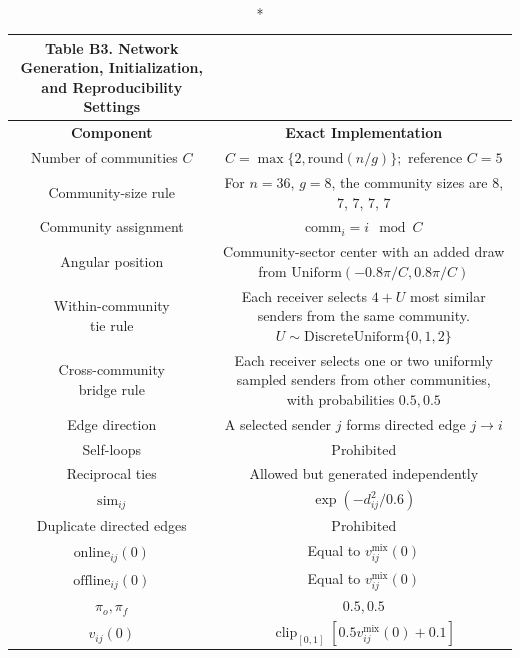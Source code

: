 \documentclass[11pt]{article}
\newcommand{\clip}{\operatorname{clip}_{[0,1]}}
\begin{document}
\begin{longtable}{|c|c|}
    \caption*{Table B3. Network Generation, Initialization, and Reproducibility Settings}
    \\
    \hline
    \textbf{Component} & \textbf{Exact Implementation} \\ \hline
    \endhead
         \hline
         Number of communities $C$&  $C=\max\{2,\text{round}(n/g)\};$ reference $C=5$\\
         \hline
         Community-size rule&  \makecell{For $n=36$, $g=8$,\\the community sizes are $8$, $7$, $7$, $7$, $7$}\\
         \hline
         Community assignment&  $\text{comm}_i=i\mod{C}$\\
         \hline
         Angular position&  \makecell{Community-sector center with an added draw\\from $\text{Uniform}(-0.8\pi/C,0.8\pi/C)$}\\
         \hline
         \makecell{Within-community\\tie rule}&  \makecell{Each receiver selects $4+U$ most similar senders\\from the same community. $U \sim \text{DiscreteUniform}\{0,1,2\}$}\\
         \hline
         \makecell{Cross-community\\bridge rule}&  \makecell{Each receiver selects one or two uniformly sampled senders\\from other communities, with probabilities $0.5,0.5$}\\
         \hline
         Edge direction&  A selected sender $j$ forms directed edge $j \rightarrow i$\\
         \hline
         Self-loops&  Prohibited\\
         \hline
         Reciprocal ties&  Allowed but generated independently\\
         \hline
         $\text{sim}_{ij}$& $\exp(-d_{ij}^2/0.6)$\\
         \hline
         Duplicate directed edges&  Prohibited\\
         \hline
         $\text{online}_{ij}(0)$&  Equal to $v_{ij}^{\text{mix}}(0)$\\
         \hline
         $\text{offline}_{ij}(0)$&  Equal to $v_{ij}^{\text{mix}}(0)$\\
         \hline
         $\pi_o,\pi_f$& $0.5, 0.5$\\
         \hline
         $v_{ij}(0)$&  $\clip[0.5v_{ij}^{\text{mix}}(0)+0.1]$\\

\end{longtable}
\end{document}
